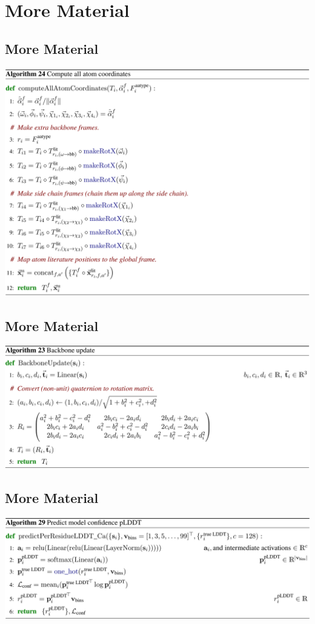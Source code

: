 \documentclass[presentation, smaller]{beamer}
\begin{document}
\section*{More Material}
\label{sec:orge0fd510}
\subsection*{More Material}
\label{sec:org9d67a90}
\begin{center}
\includegraphics[width=.9\linewidth]{./imgs/all-atom-coords-algo.png}
\end{center}
\subsection*{More Material}
\label{sec:org4fce31f}
\begin{center}
\includegraphics[width=.9\linewidth]{./imgs/backbone-update-algo.png}
\end{center}
\subsection*{More Material}
\label{sec:orgc45b495}
\begin{center}
\includegraphics[width=.9\linewidth]{./imgs/confidence-pLDDT-algo29.png}
\end{center}
\end{document}
